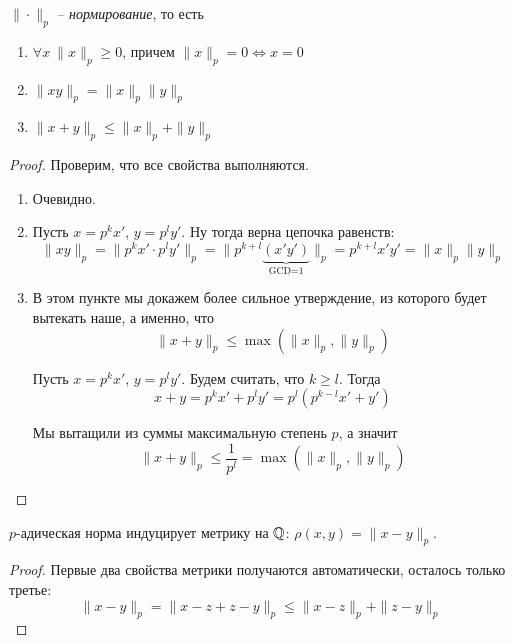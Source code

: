 \documentclass[../functional-analysis_17-18.tex]{subfiles}
\begin{document}
	\begin{statement}
		$\|\cdot\|_p$ -- \textit{нормирование}, то есть
		\begin{enumerate}
			\item $\forall x \ \|x\|_p \geq 0$, причем $\|x\|_p = 0 \iff x = 0$
			\item $\|xy\|_p = \|x\|_p\|y\|_p$
			\item $\|x + y\|_p \leq \|x\|_p + \|y\|_p$
		\end{enumerate}
	\end{statement}
	\begin{proof}
		Проверим, что все свойства выполняются.
		\begin{enumerate}
			\item Очевидно.
			\item Пусть $x = p^kx'$, $y=p^ly'$. Ну тогда верна цепочка равенств:
			\begin{equation}
				\|xy\|_p = \|p^kx' \cdot p^ly'\|_p = \|p^{k+l}\underbrace{(x'y')}_{\text{GCD=1}}\|_p = p^{k+l}x'y' = \|x\|_p\|y\|_p
			\end{equation}
			
			\item В этом пункте мы докажем более сильное утверждение, из которого будет вытекать наше, а именно, что
			\begin{equation}
				\|x+y\|_p \leq \max(\|x\|_p, \|y\|_p)
			\end{equation}
			
			Пусть $x = p^kx'$, $y=p^ly'$. Будем считать, что $k \geq l$. Тогда
			\begin{equation}
				x + y = p^kx' + p^ly' = p^l(p^{k - l}x' + y')
			\end{equation}
			
			Мы вытащили из суммы максимальную степень $p$, а значит
			\begin{equation}
				\|x + y\|_p \leq \frac{1}{p^l} = \max(\|x\|_p, \|y\|_p)
			\end{equation}
		\end{enumerate}
	\end{proof}
	\begin{corollary}
		$p$-адическая норма индуцирует метрику на $\mathbb{Q}$: $\rho(x, y) = \|x - y\|_p$.
	\end{corollary}
	\begin{proof}
		Первые два свойства метрики получаются автоматически, осталось только третье:
		\begin{equation}
			\|x - y\|_p = \|x - z + z - y\|_p \leq \|x - z\|_p + \|z - y\|_p
		\end{equation}
	\end{proof}
	
\end{document}
